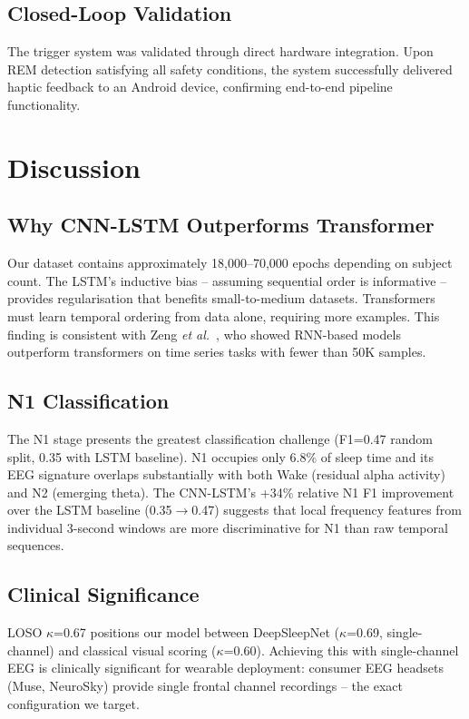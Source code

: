 \documentclass[journal]{IEEEtran}
\begin{document}
\subsection{Closed-Loop Validation}

The trigger system was validated through direct
hardware integration.
Upon REM detection satisfying all safety conditions,
the system successfully delivered haptic feedback
to an Android device, confirming end-to-end
pipeline functionality.

\section{Discussion}
\label{sec:discussion}

\subsection{Why CNN-LSTM Outperforms Transformer}

Our dataset contains approximately 18,000--70,000
epochs depending on subject count.
The LSTM's inductive bias -- assuming sequential
order is informative -- provides regularisation
that benefits small-to-medium datasets.
Transformers must learn temporal ordering from data
alone, requiring more examples.
This finding is consistent with Zeng
\emph{et al.}~\cite{zeng2023}, who showed RNN-based
models outperform transformers on time series tasks
with fewer than 50K samples.

\subsection{N1 Classification}

The N1 stage presents the greatest classification
challenge (F1=0.47 random split, 0.35 with LSTM
baseline).
N1 occupies only 6.8\% of sleep time and its EEG
signature overlaps substantially with both Wake
(residual alpha activity) and N2 (emerging theta).
The CNN-LSTM's +34\% relative N1 F1 improvement over
the LSTM baseline (0.35$\rightarrow$0.47) suggests
that local frequency features from individual
3-second windows are more discriminative for N1
than raw temporal sequences.

\subsection{Clinical Significance}

LOSO $\kappa$=0.67 positions our model between
DeepSleepNet ($\kappa$=0.69, single-channel) and
classical visual scoring ($\kappa$=0.60).
Achieving this with single-channel EEG is clinically
significant for wearable deployment: consumer EEG
headsets (Muse, NeuroSky) provide single frontal
channel recordings -- the exact configuration
we target.
\end{document}
